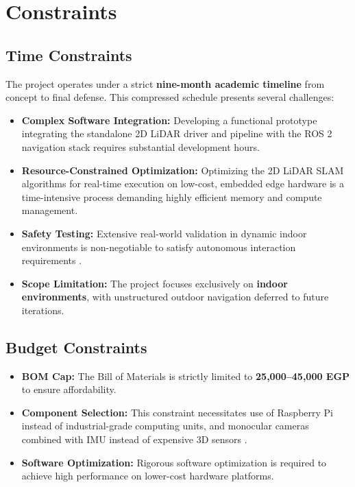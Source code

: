 \documentclass[12pt,a4paper]{report}
\begin{document}
\section{Constraints}

\subsection{Time Constraints}

The project operates under a strict \textbf{nine-month academic timeline} from concept to final defense. This compressed schedule presents several challenges:
\begin{itemize}
    \item \textbf{Complex Software Integration:} Developing a functional prototype integrating the standalone 2D LiDAR driver and pipeline with the ROS 2 navigation stack \cite{ros2,nav2} requires substantial development hours.
    \item \textbf{Resource-Constrained Optimization:} Optimizing the 2D LiDAR SLAM algorithms for real-time execution on low-cost, embedded edge hardware is a time-intensive process demanding highly efficient memory and compute management.
    \item \textbf{Safety Testing:} Extensive real-world validation in dynamic indoor environments is non-negotiable to satisfy autonomous interaction requirements \cite{iso13482}.
    \item \textbf{Scope Limitation:} The project focuses exclusively on \textbf{indoor environments}, with unstructured outdoor navigation deferred to future iterations.
\end{itemize}

\subsection{Budget Constraints}

\begin{itemize}
    \item \textbf{BOM Cap:} The Bill of Materials is strictly limited to \textbf{25,000--45,000 EGP} to ensure affordability.
    \item \textbf{Component Selection:} This constraint necessitates use of Raspberry Pi instead of industrial-grade computing units, and monocular cameras combined with IMU instead of expensive 3D sensors \cite{elalfy_monocular}.
    \item \textbf{Software Optimization:} Rigorous software optimization is required to achieve high performance on lower-cost hardware platforms.
\end{itemize}
\end{document}
